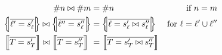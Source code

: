 \begin{align*}
\ssize{n} \broadcastsem \ssize{m} 
&= \ssize{n} 
& \text{if }n = m \\ 
% 
\sproductval{ \overline{\ell' = \vess_\ell'} } \broadcastsem \sproductval{ \overline{\ell'' = \vess_\ell''} } 
&= \sproductval{\overline{\ell = \vess_\ell' \broadcastsem \vess_\ell''} } 
& \text{for }\ell = \ell' \cup \ell'' \\
% 
\sconcatval{ \overline{T = s_T'} } \broadcastsem \sconcatval{ \overline{T = s_T''} } \ 
&= \sconcatval{ \overline{T = s_T' \broadcastsem s_T''} }
\end{align*}